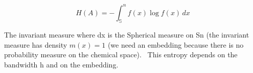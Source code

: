 \[ H(A) = -\int_\mathbb{S}^n f(x)\log f(x)\,dx  \]



The invariant measure where dx is the Spherical measure on Sn (the invariant measure has density $m(x)=1$ (we need an embedding because there is no probability measure on the chemical space). 
This entropy depends on the bandwidth h and on the embedding.
